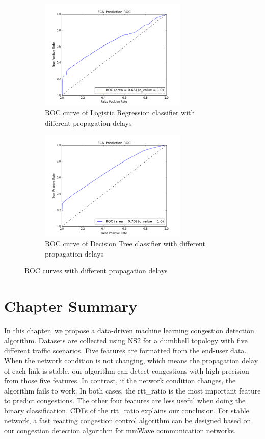 \begin{figure}[!htb]\centering
\begin{subfigure}{0.49\textwidth}
\includegraphics[width=7cm]{LRRocDiffProp.png}
\caption{ROC curve of Logistic Regression classifier with different propagation delays}
\label{LRROCDiff}
\end{subfigure}
\begin{subfigure}{0.49\textwidth}
\includegraphics[width=7cm]{DTRocDiffProp.png}
\caption{ROC curve of Decision Tree classifier with different propagation delays}
\label{DTROCDiff}
\end{subfigure}
\caption{ROC curves with different propagation delays}
\label{fig:roc2}
\end{figure}




\section{Chapter Summary}
\label{Conclusions and Future Work}
In this chapter, we propose a data-driven machine learning congestion detection algorithm. Datasets are collected using NS2 for a dumbbell topology with five different traffic scenarios. Five features are formatted from the end-user data. When the network condition is not changing, which means the propagation delay of each link is stable, our algorithm can detect congestions with high precision from those five features. In contrast, if the network condition changes, the algorithm fails to work. In both cases, the rtt\_ratio is the most important feature to predict congestions. The other four features are less useful when doing the binary classification. CDFs of the rtt\_ratio explains our conclusion. For stable network, a fast reacting congestion control algorithm can be designed based on our congestion detection algorithm for mmWave communication networks.
